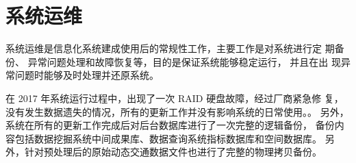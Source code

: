 

\chapter{系统运维}
系统运维是信息化系统建成使用后的常规性工作，主要工作是对系统进行定
期备份、 异常问题处理和故障恢复等，目的是保证系统能够稳定运行， 并且在出
现异常问题时能够及时处理并还原系统。

在 2017 年系统运行过程中，出现了一次 RAID 硬盘故障，经过厂商紧急修
复， 没有发生数据遗失的情况，所有的更新工作并没有影响系统的日常使用。。
另外， 系统在所有的更新工作完成后对后台数据库进行了一次完整的逻辑备份，
备份内容包括数据挖掘系统中间成果库、数据查询系统指标数据库和空间数据库。
另外，针对预处理后的原始动态交通数据文件也进行了完整的物理拷贝备份。
